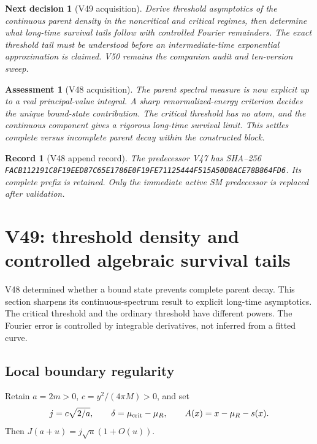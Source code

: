 \documentclass[11pt]{article}
\newtheorem{decision}[theorem]{Next decision}
\newtheorem{assessment}[theorem]{Assessment}
\newtheorem{record}[theorem]{Record}
\theoremstyle{remark}
\begin{document}
\begin{decision}[V49 acquisition]
\label{dec:v20v48-next}
Derive threshold asymptotics of the continuous parent density
in the noncritical and critical regimes, then determine what
long-time survival tails follow with controlled Fourier
remainders.  The exact threshold tail must be understood before
an intermediate-time exponential approximation is claimed.
V50 remains the companion audit and ten-version sweep.
\end{decision}

\begin{assessment}[V48 acquisition]
\label{ass:v20v48}
The parent spectral measure is now explicit up to a real
principal-value integral.  A sharp renormalized-energy criterion
decides the unique bound-state contribution.  The critical
threshold has no atom, and the continuous component gives a
rigorous long-time survival limit.  This settles complete versus
incomplete parent decay within the constructed block.
\end{assessment}

\begin{record}[V48 append record]
\label{rec:v20v48}
The predecessor V47 has SHA--256
\texttt{FACB112191C8F19EED87C65E1786E0F19FE71125444F515A50D8ACE78B864FD6}.
Its complete prefix is retained.  Only the immediate active
SM predecessor is replaced after validation.
\end{record}



\section{V49: threshold density and controlled algebraic survival tails}
\label{sec:v20v49}

V48 determined whether a bound state prevents complete parent decay.
This section sharpens its continuous-spectrum result to explicit
long-time asymptotics.  The critical threshold and the ordinary
threshold have different powers.  The Fourier error is controlled
by integrable derivatives, not inferred from a fitted curve.

\subsection{Local boundary regularity}

Retain \(a=2m>0\), \(c=y^2/(4\pi M)>0\), and set
\[
 j=c\sqrt{2/a},\qquad
 \delta=\mu_{\rm crit}-\mu_R,\qquad
 A(x)=x-\mu_R-s(x).
\]
Then \(J(a+u)=j\sqrt u(1+O(u))\).
\end{document}
